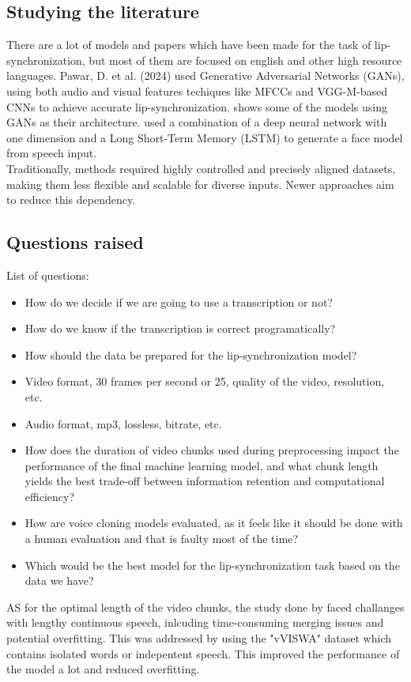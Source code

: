 \documentclass[12pt]{article}
\begin{document}
\subsection{Studying the literature}
There are a lot of models and papers which have been made for the task of lip-synchronization, but most of them are focused on english and other high resource languages. Pawar, D. et al. (2024) used Generative Adversarial Networks (GANs), using both audio and visual features techiques like MFCCs and VGG-M-based CNNs to achieve accurate lip-synchronization. \cite{PAWAR2024100084} shows some of the models using GANs as their architecture. \cite{Li_2021} used a combination of a deep neural network with one dimension and a Long Short-Term Memory (LSTM) to generate a face model from speech input.\\
Traditionally, methods required highly controlled and precisely aligned datasets, making them less flexible and scalable for diverse inputs. Newer approaches aim to reduce this dependency. 
\subsection{Questions raised}
List of questions:
\begin{itemize}
    \item How do we decide if we are going to use a transcription or not?
    \item How do we know if the transcription is correct programatically?
    \item How should the data be prepared for the lip-synchronization model?
    \item Video format, 30 frames per second or 25, quality of the video, resolution, etc.
    \item Audio format, mp3, lossless, bitrate, etc.
    \item How does the duration of video chunks used during preprocessing impact the performance of the final machine learning model, and what chunk length yields the best trade-off between information retention and computational efficiency?
    \item How are voice cloning models evaluated, as it feels like it should be done with a human evaluation and that is faulty most of the time?
    \item Which would be the best model for the lip-synchronization task based on the data we have?
\end{itemize}
AS for the optimal length of the video chunks, the study done by \cite{PAWAR2024100084} faced challanges with lengthy continuous speech, inlcuding time-consuming merging issues and potential overfitting. This was addressed by using the "vVISWA" dataset which contains isolated words or indepentent speech. This improved the performance of the model a lot and reduced overfitting.
\end{document}
